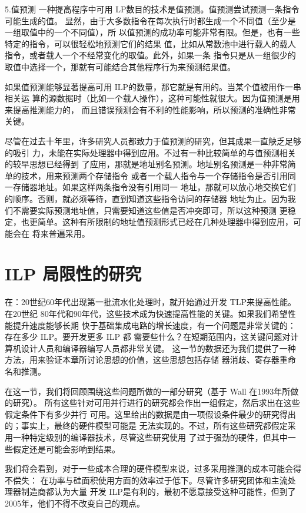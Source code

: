 5.值预测
一种提高程序中可用 LP数目的技术是值预测。值预测尝试预测一条指令可能生成的值。
显然，由于大多数指令在每次执行时都生成一个不同值（至少是一组取值中的一个不同值），所
以值预测的成功率可能非常有限。但是，也有一些特定的指令，可以很轻松地预测它们的结果
值，比如从常数池中进行载人的载人指令，或者载人一个不经常变化的取值。此外，如果一条
指令只是从一组很少的取值中选择一个，那就有可能结合其他程序行为来预测结果值。

如果值预测能够显著提高可用 ILP的数量，那它就是有用的。当某个值被用作一串相关运
算的源数据时（比如一个载人操作），这种可能性就很大。因为值预测是用来提高推测能力的，
而且错误预测会有不利的性能影响，所以预测的准确性非常关键。

尽管在过去十年里，许多研究人员都致力于值预测的研究，但其成果一直觖乏足够的吸引
力，未能在实际处理器中得到应用。不过有一种比较简单的与值预测相关的较早思想已经得到
了应用，那就是地址别名预测。地址别名预测是一种非常简单的技术，用来预测两个存储指令
或者一个载人指令与一个存储指令是否引用同一存储器地址。如果这样两条指令没有引用同一
地址，那就可以放心地交换它们的顺序。否则，就必须等待，直到知道这些指令访问的存储器
地址为止。因为我们不需要实际预测地址值，只需要知道这些值是否冲突即可，所以这种预测
更稳定，也更简单。这种有所限制的地址值预测形式已经在几种处理器中得到应用，可能会在
将来普遍采用。

\section{ILP 局限性的研究}
在：20世纪60年代出现第一批流水化处理时，就开始通过开发 TLP来提高性能。在20世纪
80年代和90年代，这些技术成为快速提高性能的关键。如果我们希望性能提升速度能够长期
快于基础集成电路的增长速度，有一个问题是非常关键的：存在多少 ILP。要开发更多 ILP 都
需要些什么？在短期范围内，这关键问题对计算机设计人员和编译器编写人员都非常关键。
这一节的数据还为我们提供了一种方法，用来验证本章所讨论思想的价值，这些思想包括存储
器消歧、寄存器重命名和推测。

在这一节，我们将回顾围绕这些问题所做的一部分研究（基于 Wall 在1993年所做的研究）。
所有这些针对可用并行进行的研究都会作出一组假定，然后求出在这些假定条件下有多少并行
可用。这里给出的数据是由一项假设条件最少的研究得出的；事实上，最终的硬件模型可能是
无法实现的。不过，所有这些研究都假定采用一种特定级别的编译器技术，尽管这些研究使用
了过于强劲的硬件，但其中一些假定还是可能会影响到结果。

我们将会看到，对于一些成本合理的硬件模型来说，过多采用推测的成本可能会得不偿失：
在功率与硅面积使用方面的效率过于低下。尽管许多研究团体和主流处理器制造商都认为大量
开发 ILP是有利的，最初不愿意接受这种可能性，但到了2005年，他们不得不改变自己的观点。

